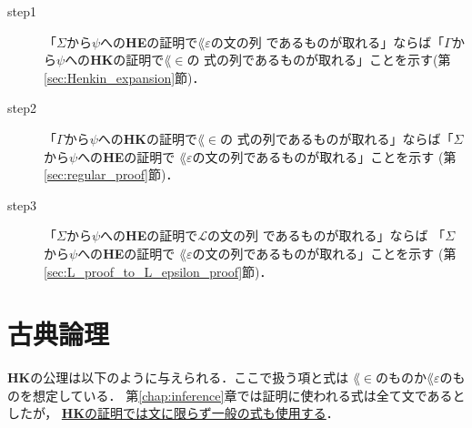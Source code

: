 	\begin{description}
		\item[step1] 「$\Sigma$から$\psi$への{\bf HE}の証明で$\lang{\varepsilon}$の文の列
			であるものが取れる」ならば「$\Gamma$から$\psi$への{\bf HK}の証明で$\lang{\in}$の
			式の列であるものが取れる」ことを示す(第\ref{sec:Henkin_expansion}節)．
			
		\item[step2] 「$\Gamma$から$\psi$への{\bf HK}の証明で$\lang{\in}$の
			式の列であるものが取れる」ならば「$\Sigma$から$\psi$への{\bf HE}の証明で
			$\lang{\varepsilon}$の文の列であるものが取れる」ことを示す
			(第\ref{sec:regular_proof}節)．
		
		\item[step3]  「$\Sigma$から$\psi$への{\bf HE}の証明で$\mathcal{L}$の文の列
			であるものが取れる」ならば 「$\Sigma$から$\psi$への{\bf HE}の証明で
			$\lang{\varepsilon}$の文の列であるものが取れる」ことを示す
			(第\ref{sec:L_proof_to_L_epsilon_proof}節)．
	\end{description}
	
\section{古典論理}
	{\bf HK}の公理は以下のように与えられる．ここで扱う項と式は
	$\lang{\in}$のものか$\lang{\varepsilon}$のものを想定している．
	第\ref{chap:inference}章では証明に使われる式は全て文であるとしたが，
	\underline{{\bf HK}の証明では文に限らず一般の式も使用する}．
	
